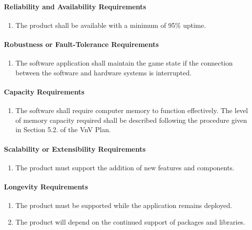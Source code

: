 \documentclass[12pt]{article}
\begin{document}
{\paragraph{Reliability and Availability Requirements}
\begin{enumerate}[{PR}1., leftmargin=2\parindent, resume]
    \item The product shall be available with a minimum of 95\% uptime. 
\end{enumerate}

\paragraph{Robustness or Fault-Tolerance Requirements}
\begin{enumerate}[{PR}1., leftmargin=2\parindent, resume]
    \item The software application shall maintain the game state if the connection between the software and hardware systems is interrupted.
\end{enumerate}

\paragraph{Capacity Requirements}
\begin{enumerate}[{PR}1., leftmargin=2\parindent, resume]
    \item The software shall require computer memory to function effectively. The level of memory capacity required shall be described following
    the procedure given in Section 5.2.\thevnvSectionNfr{} of the VnV Plan.
\end{enumerate}

\paragraph{Scalability or Extensibility Requirements}
\begin{enumerate}[{PR}1., leftmargin=2\parindent, resume]
    \item The product must support the addition of new features and components.
\end{enumerate}

\paragraph{Longevity Requirements}
\begin{enumerate}[{PR}1., leftmargin=2\parindent, resume]
    \item The product must be supported while the application remains deployed.
    \item The product will depend on the continued support of packages and libraries.
\end{enumerate}



}
\end{document}
